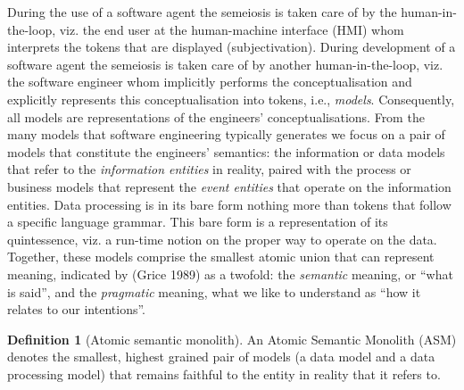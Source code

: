 \documentclass[a4paper,11pt,oneside,oldfontcommands]{memoir}
\theoremstyle{definition}
\theoremstyle{break}		%
\newtheorem{mmdef}{Definition}[chapter]
\numberwithin{equation}{chapter}
\numberwithin{figure}{chapter}
\begin{document}
During the use of a software agent the semeiosis is taken care of by the
human-in-the-loop, viz. the end user at the human-machine interface
(HMI) whom interprets the tokens that are displayed (subjectivation).
During development of a software agent the semeiosis is taken care of by
another human-in-the-loop, viz. the software engineer whom implicitly
performs the conceptualisation and explicitly represents this
conceptualisation into tokens, i.e., \emph{models}. Consequently, all
models are representations of the engineers' conceptualisations. From
the many models that software engineering typically generates we focus
on a pair of models that constitute the engineers' semantics: the
information or data
models that
refer to the \emph{information entities} in reality, paired with the
process or business models that
represent the \emph{event entities} that operate on the information
entities. Data processing is in its bare form nothing more than tokens
that follow a specific language grammar. This bare form is a
representation of its quintessence, viz. a run-time notion on the proper
way to operate on the data. Together, these models comprise the smallest
atomic union that can represent meaning, indicated by (Grice 1989) as a
twofold: the \emph{semantic} meaning, or ``what is said'', and the
\emph{pragmatic} meaning, what we like to understand as ``how it relates
to our intentions''.

\begin{mmdef}[Atomic semantic monolith]\label{def:atomic-semantic-monolith}
An Atomic Semantic Monolith (ASM) denotes the smallest, highest grained pair of models (a data model and a data processing model) that remains faithful to the entity in reality that it refers to.
\end{mmdef}
\end{document}
